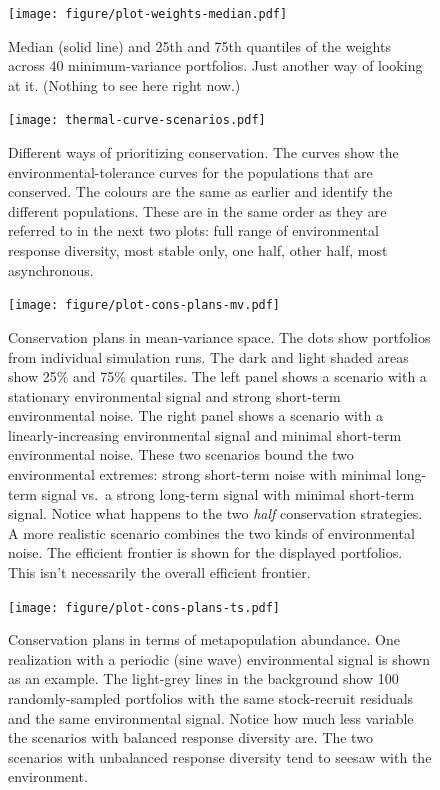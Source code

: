 \documentclass[12pt]{article}
\begin{document}
\begin{figure}[htbp]
\centering
\texttt{[image: figure/plot-weights-median.pdf]}
\caption{Median (solid line) and 25th and 75th quantiles of the weights
across 40 minimum-variance portfolios. Just another way of looking at
it. (Nothing to see here right now.)}
\end{figure}

\begin{figure}[htbp]
  \centering
    \texttt{[image: thermal-curve-scenarios.pdf]}
 \caption{Different ways of prioritizing conservation. The curves show the environmental-tolerance curves for the populations that are conserved. The colours are the same as earlier and identify the different populations. These are in the same order as they are referred to in the next two plots: full range of environmental response diversity, most stable only, one half, other half, most asynchronous.}
  \label{fig:sim-diagram}
\end{figure}

\begin{figure}[htbp]
\centering
\texttt{[image: figure/plot-cons-plans-mv.pdf]}
\caption{Conservation plans in mean-variance space. The dots show
portfolios from individual simulation runs. The dark and light shaded
areas show 25\% and 75\% quartiles. The left panel shows a scenario with
a stationary environmental signal and strong short-term environmental
noise. The right panel shows a scenario with a linearly-increasing
environmental signal and minimal short-term environmental noise. These
two scenarios bound the two environmental extremes: strong short-term
noise with minimal long-term signal vs.~a strong long-term signal with
minimal short-term signal. Notice what happens to the two \emph{half}
conservation strategies. A more realistic scenario combines the two
kinds of environmental noise. The efficient frontier is shown for the
displayed portfolios. This isn't necessarily the overall efficient
frontier.\label{fig:cons-plans-mv}}
\end{figure}

\begin{figure}[htbp]
\centering
\texttt{[image: figure/plot-cons-plans-ts.pdf]}
\caption{Conservation plans in terms of metapopulation abundance. One
realization with a periodic (sine wave) environmental signal is shown as
an example. The light-grey lines in the background show 100
randomly-sampled portfolios with the same stock-recruit residuals and
the same environmental signal. Notice how much less variable the
scenarios with balanced response diversity are. The two scenarios with
unbalanced response diversity tend to seesaw with the environment.}
\end{figure}
\end{document}
